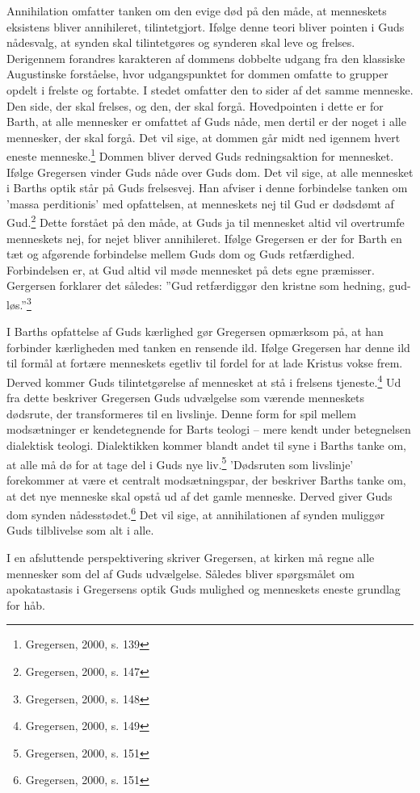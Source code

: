 Annihilation omfatter tanken om den evige død på den måde, at menneskets eksistens bliver annihileret, tilintetgjort. Ifølge denne teori bliver pointen i Guds nådesvalg, at synden skal tilintetgøres og synderen skal leve og frelses. Derigennem forandres karakteren af dommens dobbelte udgang fra den klassiske Augustinske forståelse, hvor udgangspunktet for dommen omfatte to grupper opdelt i frelste og fortabte. I stedet omfatter den to sider af det samme menneske. Den side, der skal frelses, og den, der skal forgå. Hovedpointen i dette er for Barth, at alle mennesker er omfattet af Guds nåde, men dertil er der noget i alle mennesker, der skal forgå. Det vil sige, at dommen går midt ned igennem hvert eneste menneske.\footnote{Gregersen, 2000, s. 139} Dommen bliver derved Guds redningsaktion for mennesket. Ifølge Gregersen vinder Guds nåde over Guds dom. Det vil sige, at alle mennesket i Barths optik står på Guds frelsesvej. Han afviser i denne forbindelse tanken om 'massa perditionis' med opfattelsen, at menneskets nej til Gud er dødsdømt af Gud.\footnote{Gregersen, 2000, s. 147} Dette forstået på den måde, at Guds ja til mennesket altid vil overtrumfe menneskets nej, for nejet bliver annihileret. Ifølge Gregersen er der for Barth en tæt og afgørende forbindelse mellem Guds dom og Guds retfærdighed. Forbindelsen er, at Gud altid vil møde mennesket på dets egne præmisser. Gergersen forklarer det således: ”Gud retfærdiggør den kristne som hedning, gud-løs.”\footnote{Gregersen, 2000, s. 148} 

I Barths opfattelse af Guds kærlighed gør Gregersen opmærksom på, at han forbinder kærligheden med tanken en rensende ild. Ifølge Gregersen har denne ild til formål at fortære menneskets egetliv til fordel for at lade Kristus vokse frem. Derved kommer Guds tilintetgørelse af mennesket at stå i frelsens tjeneste.\footnote{Gregersen, 2000, s. 149} Ud fra dette beskriver Gregersen Guds udvælgelse som værende menneskets dødsrute, der transformeres til en livslinje. Denne form for spil mellem modsætninger er kendetegnende for Barts teologi -- mere kendt under betegnelsen dialektisk teologi. Dialektikken kommer blandt andet til syne i Barths tanke om, at alle må dø for at tage del i Guds nye liv.\footnote{Gregersen, 2000, s. 151} 'Dødsruten som livslinje' forekommer at være et centralt modsætningspar, der beskriver Barths tanke om, at det nye menneske skal opstå ud af det gamle menneske. Derved giver Guds dom synden nådesstødet.\footnote{Gregersen, 2000, s. 151} Det vil sige, at annihilationen af synden muliggør Guds tilblivelse som alt i alle. 

I en afsluttende perspektivering skriver Gregersen, at kirken må regne alle mennesker som del af Guds udvælgelse. Således bliver spørgsmålet om apokatastasis i Gregersens optik Guds mulighed og menneskets eneste grundlag for håb. 
